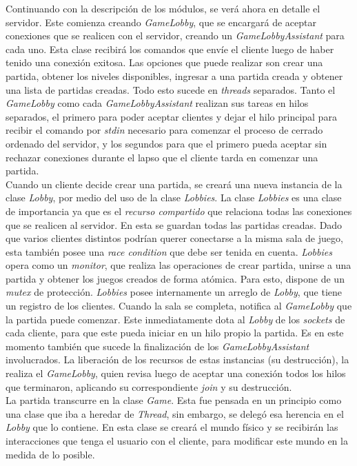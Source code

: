 Continuando con la descripción de los módulos, se verá ahora en detalle el servidor. Este comienza creando \textit{\emph{GameLobby}}, que se encargará de aceptar conexiones que se realicen con el servidor, creando un \textit{\emph{GameLobbyAssistant}} para cada uno. Esta clase recibirá los comandos que envíe el cliente luego de haber tenido una conexión exitosa. Las opciones que puede realizar son crear una partida, obtener los niveles disponibles, ingresar a una partida creada y obtener una lista de partidas creadas. Todo esto sucede en  \textit{\emph{threads}} separados. Tanto el \textit{GameLobby} como cada \textit{GameLobbyAssistant} realizan sus tareas en hilos separados, el primero para poder aceptar clientes y dejar el hilo principal para recibir el comando por \textit{\emph{stdin}} necesario para comenzar el proceso de cerrado ordenado del servidor, y los segundos para que el primero pueda aceptar sin rechazar conexiones durante el lapso que el cliente tarda en comenzar una partida.\\
\indent Cuando un cliente decide crear una partida, se creará una nueva instancia de la clase \textit{\emph{Lobby}}, por medio del uso de la clase \textit{\emph{Lobbies}}. La clase \textit{Lobbies} es una clase de importancia ya que es el \emph{recurso compartido} que relaciona todas las conexiones que se realicen al servidor. En esta se guardan todas las partidas creadas. Dado que varios clientes distintos podrían querer conectarse a la misma sala de juego, esta también posee una \textit{\emph{race condition}} que debe ser tenida en cuenta. \textit{Lobbies} opera como un \emph{monitor}, que realiza las operaciones de crear partida, unirse a una partida y obtener los juegos creados de forma atómica. Para esto, dispone de un \textit{mutex} de protección. \textit{Lobbies} posee internamente un arreglo de \textit{\emph{Lobby}}, que tiene un registro de los clientes. Cuando la sala se completa, notifica al \textit{GameLobby} que la partida puede comenzar. Este inmediatamente dota al \textit{Lobby} de los \textit{sockets} de cada cliente, para que este pueda iniciar en un hilo propio la partida. Es en este momento también que sucede la finalización de los \textit{GameLobbyAssistant} involucrados. La liberación de los recursos de estas instancias (su destrucción), la realiza el \textit{GameLobby}, quien revisa luego de aceptar una conexión todos los hilos que terminaron, aplicando su correspondiente \textit{\emph{join}} y su destrucción.\\
\indent La partida transcurre en la clase \textit{\emph{Game}}. Esta fue pensada en un principio como una clase que iba a heredar de \textit{Thread}, sin embargo, se delegó esa herencia en el \textit{Lobby} que lo contiene. En esta clase se creará el mundo físico y se recibirán las interacciones que tenga el usuario con el cliente, para modificar este mundo en la medida de lo posible.\\
